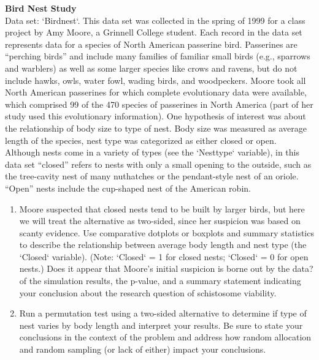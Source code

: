 \documentclass[
]{report}
\begin{document}
\begin{list}{E.}{ \setlength{\itemsep}{0.5em}}
  \item \textbf{Bird Nest Study} \\
  Data set: `Birdnest`. This data set was collected in the spring of 1999 for a class project by Amy Moore, a Grinnell College
student. Each record in the data set represents data for a species of North American passerine
bird. Passerines are “perching birds” and include many families of familiar small birds (e.g., sparrows
and warblers) as well as some larger species like crows and ravens, but do not include hawks,
owls, water fowl, wading birds, and woodpeckers. Moore took all North American passerines for
which complete evolutionary data were available, which comprised 99 of the 470 species of passerines
in North America (part of her study used this evolutionary information). One hypothesis of
interest was about the relationship of body size to type of nest. Body size was measured as average
length of the species, nest type was categorized as either closed or open. Although nests come in
a variety of types (see the `Nesttype` variable), in this data set “closed” refers to nests with only a
small opening to the outside, such as the tree-cavity nest of many nuthatches or the pendant-style
nest of an oriole. “Open” nests include the cup-shaped nest of the American robin.
  \begin{enumerate}
    \setcounter{enumi}{0}  
    \item Moore suspected that closed nests tend to be built by larger birds, but here we will treat the alternative
as two-sided, since her suspicion was based on scanty evidence. Use comparative dotplots
or boxplots and summary statistics to describe the relationship between average body length
and nest type (the `Closed` variable). (Note: `Closed` = 1 for closed nests; `Closed` = 0 for open
nests.) Does it appear that Moore’s initial suspicion is borne out by the data?
of the simulation results, the p-value, and a summary statement indicating your conclusion
about the research question of schistosome viability.
    \item Run a permutation test using a two-sided alternative to determine if type of nest varies by body
length and interpret your results. Be sure to state your conclusions in the context of the problem and
address how random allocation and random sampling (or lack of either) impact your conclusions.
  \end{enumerate}
  

\end{list}
\end{document}
